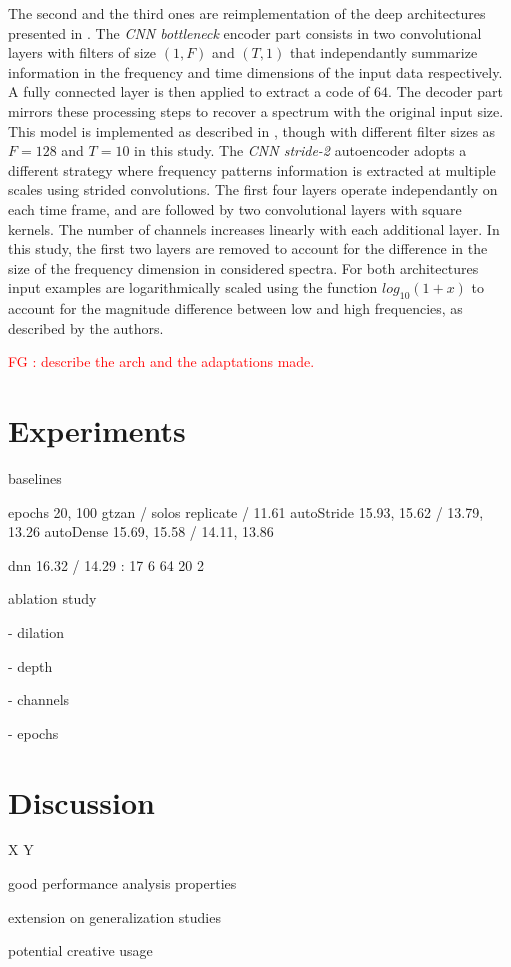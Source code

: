 \documentclass{article}
\newcommand{\fg}[1]{\textcolor{red}{FG : #1}}
\begin{document}
The second and the third ones are reimplementation of the deep architectures presented in \cite{miron2018high}. The \textit{CNN bottleneck} encoder part consists in two convolutional layers with filters of size $(1, F)$ and $(T, 1)$ that independantly summarize information in the frequency and time dimensions of the input data respectively. A fully connected layer is then applied to extract a code of $64$. The decoder part mirrors these processing steps to recover a spectrum with the original input size. This model is implemented as described in \cite{miron2018high}, though with different filter sizes as $F=128$ and $T=10$ in this study. The \textit{CNN stride-2} autoencoder adopts a different strategy where frequency patterns information is extracted at multiple scales using strided convolutions. The first four layers operate independantly on each time frame, and are followed by two convolutional layers with square kernels. The number of channels increases linearly with each additional layer. In this study, the first two layers are removed to account for the difference in the size of the frequency dimension in considered spectra. For both architectures input examples are logarithmically scaled using the function $log_{10}(1+x)$ to account for the magnitude difference between low and high frequencies, as described by the authors.

\fg{describe the arch and the adaptations made.}


\section{Experiments}
\label{sec:experiments}

baselines

epochs 20, 100
gtzan / solos
replicate  / 11.61
autoStride  15.93, 15.62 / 13.79, 13.26
autoDense 15.69, 15.58 / 14.11,  13.86

dnn 16.32 / 14.29 : 17 6 64 20 2

ablation study

- dilation

- depth

- channels

- epochs


\section{Discussion}
\label{sec:discussion}

X Y

good performance analysis properties

extension on generalization studies

potential creative usage

\vfill\pagebreak




\end{document}
